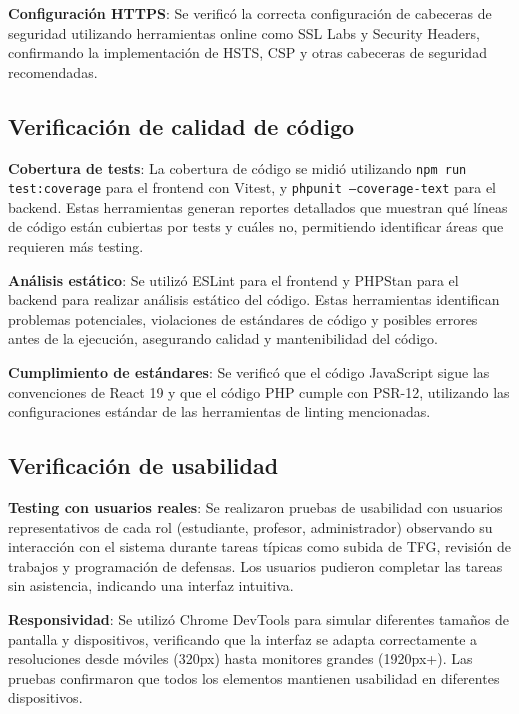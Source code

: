 \documentclass[12pt,a4paper,oneside]{report}
\begin{document}
\textbf{Configuración HTTPS}: Se verificó la correcta configuración de cabeceras de seguridad utilizando herramientas online como SSL Labs y Security Headers, confirmando la implementación de HSTS, CSP y otras cabeceras de seguridad recomendadas.

\subsection{Verificación de calidad de código}\label{verificacion-calidad-codigo}

\textbf{Cobertura de tests}: La cobertura de código se midió utilizando \texttt{npm run test:coverage} para el frontend con Vitest, y \texttt{phpunit --coverage-text} para el backend. Estas herramientas generan reportes detallados que muestran qué líneas de código están cubiertas por tests y cuáles no, permitiendo identificar áreas que requieren más testing.

\textbf{Análisis estático}: Se utilizó ESLint para el frontend y PHPStan para el backend para realizar análisis estático del código. Estas herramientas identifican problemas potenciales, violaciones de estándares de código y posibles errores antes de la ejecución, asegurando calidad y mantenibilidad del código.

\textbf{Cumplimiento de estándares}: Se verificó que el código JavaScript sigue las convenciones de React 19 y que el código PHP cumple con PSR-12, utilizando las configuraciones estándar de las herramientas de linting mencionadas.

\subsection{Verificación de usabilidad}\label{verificacion-usabilidad}

\textbf{Testing con usuarios reales}: Se realizaron pruebas de usabilidad con usuarios representativos de cada rol (estudiante, profesor, administrador) observando su interacción con el sistema durante tareas típicas como subida de TFG, revisión de trabajos y programación de defensas. Los usuarios pudieron completar las tareas sin asistencia, indicando una interfaz intuitiva.

\textbf{Responsividad}: Se utilizó Chrome DevTools para simular diferentes tamaños de pantalla y dispositivos, verificando que la interfaz se adapta correctamente a resoluciones desde móviles (320px) hasta monitores grandes (1920px+). Las pruebas confirmaron que todos los elementos mantienen usabilidad en diferentes dispositivos.
\end{document}
